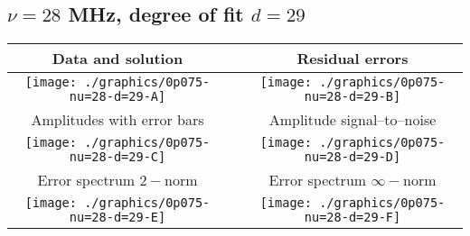 

% 

\clearpage{}
\break{}

\subsection{$\nu = 28$ MHz, degree of fit $d = 29$}

\begin{table}[h]
    \begin{center}
        \begin{tabular}{ccc}
            Data and solution & \quad & Residual errors \\\hline
            \texttt{[image: ./graphics/0p075-nu=28-d=29-A]} &&
            \texttt{[image: ./graphics/0p075-nu=28-d=29-B]} \\[15pt]
            Amplitudes with error bars && Amplitude signal--to--noise \\\hline
            \texttt{[image: ./graphics/0p075-nu=28-d=29-C]} &&
            \texttt{[image: ./graphics/0p075-nu=28-d=29-D]} \\[15pt]
            Error spectrum $2-$norm && Error spectrum $\infty-$norm \\\hline
            \texttt{[image: ./graphics/0p075-nu=28-d=29-E]} &&
            \texttt{[image: ./graphics/0p075-nu=28-d=29-F]} \\[15pt]
        \end{tabular}
    \end{center}
\label{fig:elev=75, nu=28}
\end{table}



\endinput
